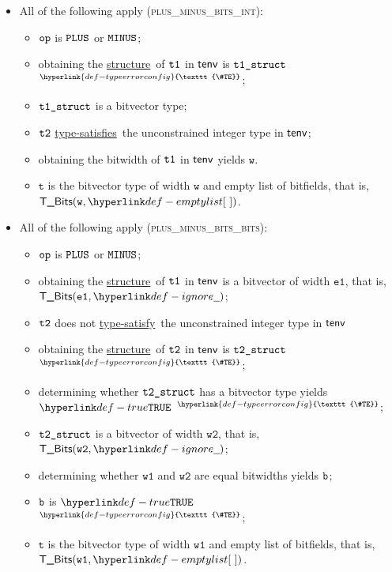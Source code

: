 \documentclass{book}
\newcommand\TypeErrorConfig[0]{\hyperlink{def-typeerrorconfig}{\texttt{\#TE}}}
\newcommand\ProseOrTypeError[0]{\hyperlink{def-proseortypeerror}{$^{\TypeErrorConfig}$}}
\newcommand\structure[0]{\hyperlink{def-structure}{structure}}
\newcommand\typesatisfies[0]{\hyperlink{def-typesatisfies}{type-satisfies}}
\newcommand\typesatisfy[0]{\hyperlink{def-typesatisfies}{type-satisfy}}
\newcommand\vt[0]{\texttt{t}}
\newcommand\veone[0]{\texttt{e1}}
\newcommand\vw[0]{\texttt{w}}
\newcommand\vwone[0]{\texttt{w1}}
\newcommand\vwtwo[0]{\texttt{w2}}
\begin{document}
\begin{itemize}
  \item All of the following apply (\textsc{plus\_minus\_bits\_int}):
  \begin{itemize}
    \item $\texttt{op}$ is $\texttt{PLUS}$ or $\texttt{MINUS}$;
    \item obtaining the \structure\ of $\texttt{t1}$ in $\textsf{tenv}$ is $\texttt{t1\_struct}$ \ProseOrTypeError;
    \item $\texttt{t1\_struct}$ is a bitvector type;
    \item $\texttt{t2}$ \typesatisfies\ the unconstrained integer type in $\textsf{tenv}$;
    \item obtaining the bitwidth of $\texttt{t1}$ in $\textsf{tenv}$ yields $\vw$.
    \item $\vt$ is the bitvector type of width $\vw$ and empty list of bitfields, that is, \\ $\TBits(\vw, \emptylist)$.
  \end{itemize}

  \item All of the following apply (\textsc{plus\_minus\_bits\_bits}):
  \begin{itemize}
    \item $\texttt{op}$ is $\texttt{PLUS}$ or $\texttt{MINUS}$;
    \item obtaining the \structure\ of $\texttt{t1}$ in $\textsf{tenv}$ is a bitvector of width $\veone$, that is,\\ $\TBits(\veone, \Ignore)$;
    \item $\texttt{t2}$ does not \typesatisfy\ the unconstrained integer type in $\textsf{tenv}$
    \item obtaining the \structure\ of $\texttt{t2}$ in $\textsf{tenv}$ is $\texttt{t2\_struct}$ \ProseOrTypeError;
    \item determining whether $\texttt{t2\_struct}$ has a bitvector type yields $\True$ \ProseOrTypeError;
    \item $\texttt{t2\_struct}$ is a bitvector of width $\vwtwo$, that is, $\TBits(\vwtwo, \Ignore)$;
    \item determining whether $\vwone$ and $\vwtwo$ are equal bitwidths yields $\texttt{b}$;
    \item $\texttt{b}$ is $\True$ \ProseOrTypeError;
    \item $\vt$ is the bitvector type of width $\vwone$ and empty list of bitfields, that is, \\ $\TBits(\vwone, \emptylist)$.
  \end{itemize}


\end{itemize}
\end{document}
